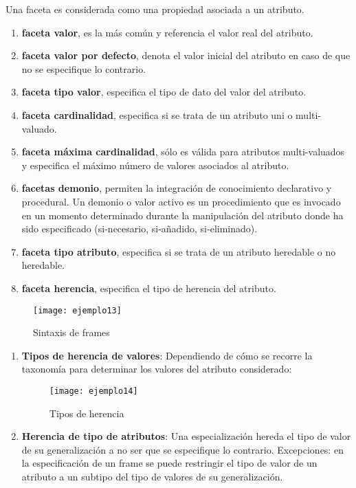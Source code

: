 \documentclass[12pt]{article}
\begin{document}
Una faceta es considerada como una propiedad asociada a un atributo.
\begin{enumerate}
\item \textbf{faceta valor}, es la más común y referencia el valor real del atributo.
\item \textbf{faceta valor por defecto}, denota el valor inicial del atributo en caso de que no se especifique lo contrario.
\item \textbf{faceta tipo valor}, especifica el tipo de dato del valor del atributo.
\item \textbf{faceta cardinalidad}, especifica si se trata de un atributo uni o multi-valuado.
\item \textbf{faceta máxima cardinalidad}, sólo es válida para atributos multi-valuados y especifica el máximo número de valores asociados al atributo.
\item \textbf{facetas demonio}, permiten la integración de conocimiento declarativo y procedural. Un demonio o valor activo es un procedimiento que es invocado en un momento determinado durante la manipulación del atributo donde ha sido especificado (si-necesario, si-añadido, si-eliminado).
\item \textbf{faceta tipo atributo}, especifica si se trata de un atributo heredable o no heredable.
\item  \textbf{faceta herencia}, especifica el tipo de herencia del atributo.
\end{enumerate}

\begin{figure}[H]
\centering
\texttt{[image: ejemplo13]}
\caption{Sintaxis de frames}
\label{fig:ejemplo13}
\end{figure}

\begin{enumerate}
\item \textbf{Tipos de herencia de valores}: Dependiendo de cómo se recorre la taxonomía para determinar los valores del atributo considerado:
\begin{figure}[H]
\centering
\texttt{[image: ejemplo14]}
\caption{Tipos de herencia}
\label{fig:ejemplo14}
\end{figure}
\item \textbf{Herencia de tipo de atributos}: Una especialización hereda el tipo de valor de su generalización a no ser que se especifique lo contrario. Excepciones: en la especificación de un frame se puede restringir el tipo de valor de un atributo a un subtipo del tipo de valores de su generalización.
\end{enumerate}
\end{document}
